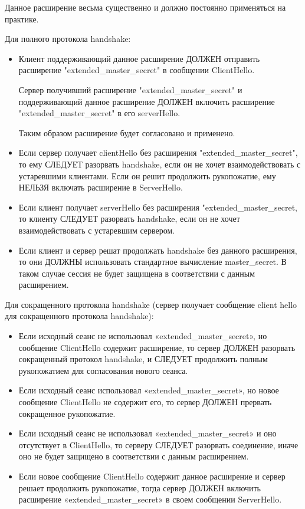 Данное расширение весьма существенно и должно постоянно применяться на практике.

Для полного протокола handshake:
\begin{itemize}
	\item Клиент поддерживающий данное расширение ДОЛЖЕН отправить расширение "extended\_master\_secret" в сообщении ClientHello. 
	
	Сервер получивший расширение "extended\_master\_secret" и поддерживающий данное расширение ДОЛЖЕН включить расширение "extended\_master\_secret" в его serverHello. 
	
	Таким образом расширение будет согласовано и применено. 
	
	\item 	Если сервер получает clientHello без расширения "extended\_master\_secret", то ему СЛЕДУЕТ разорвать handshake, если он не хочет взаимодействовать с устаревшими
	клиентами. Если он решит продолжить рукопожатие, ему НЕЛЬЗЯ включать расширение в ServerHello.
	
	\item Если клиент получает serverHello без расширения "extended\_master\_secret, то клиенту СЛЕДУЕТ разорвать handshake, если он не хочет взаимодействовать с устаревшим сервером.
	
	\item 	Если клиент и сервер решат продолжать handshake без данного расширения, то они ДОЛЖНЫ использовать стандартное вычисление master\_secret. В таком случае сессия не будет защищена в соответствии с данным расширением. 
	
	
\end{itemize}

Для сокращенного протокола handshake (сервер получает сообщение client hello для сокращенного протокола handshake):

\begin{itemize}
	\item 	Если исходный сеанс не использовал «extended\_master\_secret», но сообщение ClientHello содержит расширение, то сервер ДОЛЖЕН разорвать сокращенный протокол handshake, и СЛЕДУЕТ продолжить полным рукопожатием для согласования нового сеанса.
	
	\item   Если исходный сеанс использовал «extended\_master\_secret», но новое сообщение ClientHello не содержит его, то сервер ДОЛЖЕН прервать сокращенное рукопожатие.
	
	\item Если исходный сеанс не использовал «extended\_master\_secret» и оно отсутствует в ClientHello, то серверу СЛЕДУЕТ разорвать соединение, иначе оно не будет защищено в соответствии с данным расширением.
	
	\item  Если новое сообщение ClientHello содержит данное расширение и сервер
	решает продолжить рукопожатие, тогда сервер ДОЛЖЕН включить
	расширение «extended\_master\_secret» в своем сообщении ServerHello.
\end{itemize}


